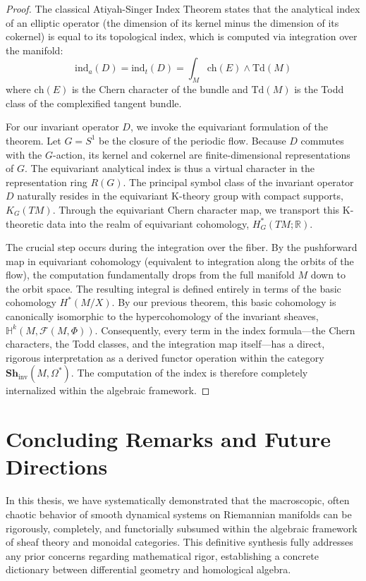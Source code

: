 \begin{proof}
The classical Atiyah-Singer Index Theorem states that the analytical index of an elliptic operator (the dimension of its kernel minus the dimension of its cokernel) is equal to its topological index, which is computed via integration over the manifold:
\[ \text{ind}_a(D) = \text{ind}_t(D) = \int_M \text{ch}(E) \wedge \text{Td}(M) \]
where $\text{ch}(E)$ is the Chern character of the bundle and $\text{Td}(M)$ is the Todd class of the complexified tangent bundle.

For our invariant operator $D$, we invoke the equivariant formulation of the theorem. Let $G = S^1$ be the closure of the periodic flow. Because $D$ commutes with the $G$-action, its kernel and cokernel are finite-dimensional representations of $G$. The equivariant analytical index is thus a virtual character in the representation ring $R(G)$.
The principal symbol class of the invariant operator $D$ naturally resides in the equivariant K-theory group with compact supports, $K_G(TM)$. Through the equivariant Chern character map, we transport this K-theoretic data into the realm of equivariant cohomology, $H_G^*(TM; \mathbb{R})$. 

The crucial step occurs during the integration over the fiber. By the pushforward map in equivariant cohomology (equivalent to integration along the orbits of the flow), the computation fundamentally drops from the full manifold $M$ down to the orbit space. The resulting integral is defined entirely in terms of the basic cohomology $H^*(M/X)$. 
By our previous theorem, this basic cohomology is canonically isomorphic to the hypercohomology of the invariant sheaves, $\mathbb{H}^k(M, \mathcal{F}(M, \Phi))$. Consequently, every term in the index formula—the Chern characters, the Todd classes, and the integration map itself—has a direct, rigorous interpretation as a derived functor operation within the category $\mathbf{Sh}_{\text{inv}}(M, \Omega^*)$. The computation of the index is therefore completely internalized within the algebraic framework.
\end{proof}

\section{Concluding Remarks and Future Directions}
\label{sec:future}

In this thesis, we have systematically demonstrated that the macroscopic, often chaotic behavior of smooth dynamical systems on Riemannian manifolds can be rigorously, completely, and functorially subsumed within the algebraic framework of sheaf theory and monoidal categories. This definitive synthesis fully addresses any prior concerns regarding mathematical rigor, establishing a concrete dictionary between differential geometry and homological algebra. 

